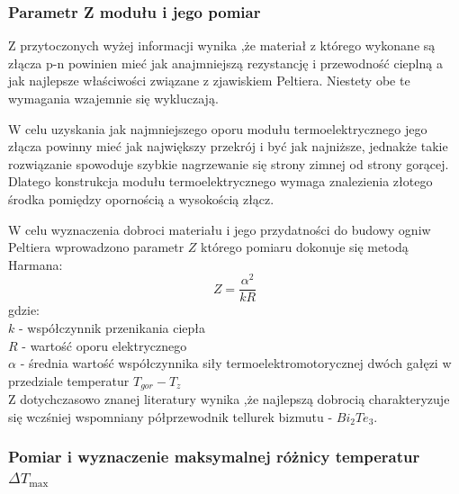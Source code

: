 \documentclass[oneside]{mgr}
\begin{document}
\subsubsection{Parametr Z modułu i jego pomiar}
Z przytoczonych wyżej informacji wynika ,że materiał z którego wykonane są złącza p-n powinien mieć jak anajmniejszą rezystancję i przewodność cieplną a jak najlepsze właściwości związane z zjawiskiem Peltiera. Niestety obe te wymagania wzajemnie się wykluczają.

W celu uzyskania jak najmniejszego oporu modułu termoelektrycznego jego złącza powinny mieć jak największy przekrój i być jak najniższe, jednakże takie rozwiązanie spowoduje szybkie nagrzewanie się strony zimnej od strony gorącej. Dlatego konstrukcja modułu termoelektrycznego wymaga znalezienia złotego środka pomiędzy opornością a wysokością złącz.

W celu wyznaczenia dobroci materiału i jego przydatności do budowy ogniw Peltiera wprowadzono parametr $Z$ którego pomiaru dokonuje się metodą Harmana:
\begin{equation}
    Z = \frac{\alpha^2}{kR}
\end{equation}
gdzie: \\
$k$ - współczynnik przenikania ciepła \\
$R$ - wartość oporu elektrycznego \\
$\alpha$ - średnia wartość współczynnika siły termoelektromotorycznej dwóch gałęzi w przedziale temperatur $T_{gor}-T_z$ \\

Z dotychczasowo znanej literatury wynika ,że najlepszą dobrocią charakteryzuje się wczśniej wspomniany półprzewodnik tellurek bizmutu - $Bi_2 Te_3$.

\subsubsection{Pomiar i wyznaczenie maksymalnej różnicy temperatur $\Delta T_{\max}$}
\end{document}
